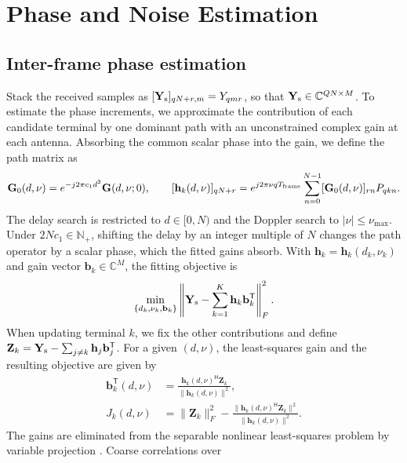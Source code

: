 \section{Phase and Noise Estimation}
\label{app:frontend}

\subsection{Inter-frame phase estimation}
Stack the received samples as
$[\mathbf Y_{\rm s}]_{qN+r,m}=Y_{qmr}$, so that
$\mathbf Y_{\rm s}\in\mathbb C^{QN\times M}$.
To estimate the phase increments, we approximate the contribution of each
candidate terminal by one dominant path with an unconstrained complex
gain at each antenna.
Absorbing the common scalar phase into the gain, we define the path matrix as
\begin{equation}
 \mathbf G_0(d,\nu)=e^{-j2\pi c_1d^2}\mathbf G(d,\nu;0),\qquad
 [\mathbf h_k(d,\nu)]_{qN+r}
 =e^{j2\pi\nu qT_{\rm frame}}
 \sum_{n=0}^{N-1}[\mathbf G_0(d,\nu)]_{rn}P_{qkn}.
 \label{eq:phase-atom}
\end{equation}
The delay search is restricted to $d\in[0,N)$ and the Doppler search to $|\nu|\leq\nu_{\max}$. Under $2Nc_1\in\mathbb N_+$, shifting
the delay by an integer multiple of $N$ changes the path operator by
a scalar phase, which the fitted gains absorb. With
$\mathbf h_k=\mathbf h_k(d_k,\nu_k)$ and gain vector
$\mathbf b_k\in\mathbb C^M$, the fitting objective is
\begin{equation}
 \min_{\{d_k,\nu_k,\mathbf b_k\}}
 \left\|\mathbf Y_{\rm s}-\sum_{k=1}^K
 \mathbf h_k\mathbf b_k^{\mathsf T}\right\|_F^2.
 \label{eq:phase-fit}
\end{equation}
When updating terminal $k$, we fix the other contributions and define
$\mathbf Z_k=\mathbf Y_{\rm s}-\sum_{j\ne k}
\mathbf h_j\mathbf b_j^{\mathsf T}$. For a given $(d,\nu)$, the
least-squares gain and the resulting objective are given by
\begin{equation}
 \begin{aligned}
 \mathbf b_k^{\mathsf T}(d,\nu)
 &=\frac{\mathbf h_k(d,\nu)^{\mathsf H}\mathbf Z_k}
 {\|\mathbf h_k(d,\nu)\|^2},\\
 J_k(d,\nu)&=\|\mathbf Z_k\|_F^2-
 \frac{\|\mathbf h_k(d,\nu)^{\mathsf H}\mathbf Z_k\|^2}
 {\|\mathbf h_k(d,\nu)\|^2}.
 \end{aligned}
 \label{eq:phase-variable-projection}
\end{equation}
The gains are eliminated from the separable nonlinear least-squares
problem by variable projection \cite[Secs.~1 and 2]{oleary2013}. Coarse correlations over
